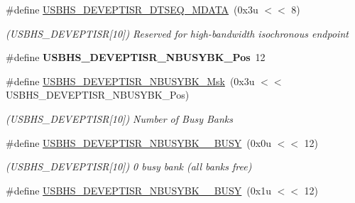 \begin{DoxyCompactItemize}
\mbox{\label{group__SAME70__USBHS_ga568eb6f4113642173ebcf3c303ad086e}} 
\#define \mbox{\hyperlink{group__SAME70__USBHS_ga568eb6f4113642173ebcf3c303ad086e}{U\+S\+B\+H\+S\+\_\+\+D\+E\+V\+E\+P\+T\+I\+S\+R\+\_\+\+D\+T\+S\+E\+Q\+\_\+\+M\+D\+A\+TA}}~(0x3u $<$$<$ 8)
\begin{DoxyCompactList}\small\item\em (U\+S\+B\+H\+S\+\_\+\+D\+E\+V\+E\+P\+T\+I\+SR\mbox{[}10\mbox{]}) Reserved for high-\/bandwidth isochronous endpoint \end{DoxyCompactList}\item 
\mbox{\label{group__SAME70__USBHS_gaa83d9b1cf59f18b0740871ce1541b398}} 
\#define {\bfseries U\+S\+B\+H\+S\+\_\+\+D\+E\+V\+E\+P\+T\+I\+S\+R\+\_\+\+N\+B\+U\+S\+Y\+B\+K\+\_\+\+Pos}~12
\item 
\mbox{\label{group__SAME70__USBHS_ga4119a6fbd21e0fa7cdc7260da0996337}} 
\#define \mbox{\hyperlink{group__SAME70__USBHS_ga4119a6fbd21e0fa7cdc7260da0996337}{U\+S\+B\+H\+S\+\_\+\+D\+E\+V\+E\+P\+T\+I\+S\+R\+\_\+\+N\+B\+U\+S\+Y\+B\+K\+\_\+\+Msk}}~(0x3u $<$$<$ U\+S\+B\+H\+S\+\_\+\+D\+E\+V\+E\+P\+T\+I\+S\+R\+\_\+\+N\+B\+U\+S\+Y\+B\+K\+\_\+\+Pos)
\begin{DoxyCompactList}\small\item\em (U\+S\+B\+H\+S\+\_\+\+D\+E\+V\+E\+P\+T\+I\+SR\mbox{[}10\mbox{]}) Number of Busy Banks \end{DoxyCompactList}\item 
\mbox{\label{group__SAME70__USBHS_ga1d6f576b3dd9ea1df914ac0f6955a12e}} 
\#define \mbox{\hyperlink{group__SAME70__USBHS_ga1d6f576b3dd9ea1df914ac0f6955a12e}{U\+S\+B\+H\+S\+\_\+\+D\+E\+V\+E\+P\+T\+I\+S\+R\+\_\+\+N\+B\+U\+S\+Y\+B\+K\+\_\+\_\+\+B\+U\+SY}}~(0x0u $<$$<$ 12)
\begin{DoxyCompactList}\small\item\em (U\+S\+B\+H\+S\+\_\+\+D\+E\+V\+E\+P\+T\+I\+SR\mbox{[}10\mbox{]}) 0 busy bank (all banks free) \end{DoxyCompactList}\item 
\mbox{\label{group__SAME70__USBHS_gaa68c69091069c73fd28083895e80d878}} 
\#define \mbox{\hyperlink{group__SAME70__USBHS_gaa68c69091069c73fd28083895e80d878}{U\+S\+B\+H\+S\+\_\+\+D\+E\+V\+E\+P\+T\+I\+S\+R\+\_\+\+N\+B\+U\+S\+Y\+B\+K\+\_\+\_\+\+B\+U\+SY}}~(0x1u $<$$<$ 12)

\end{DoxyCompactItemize}
